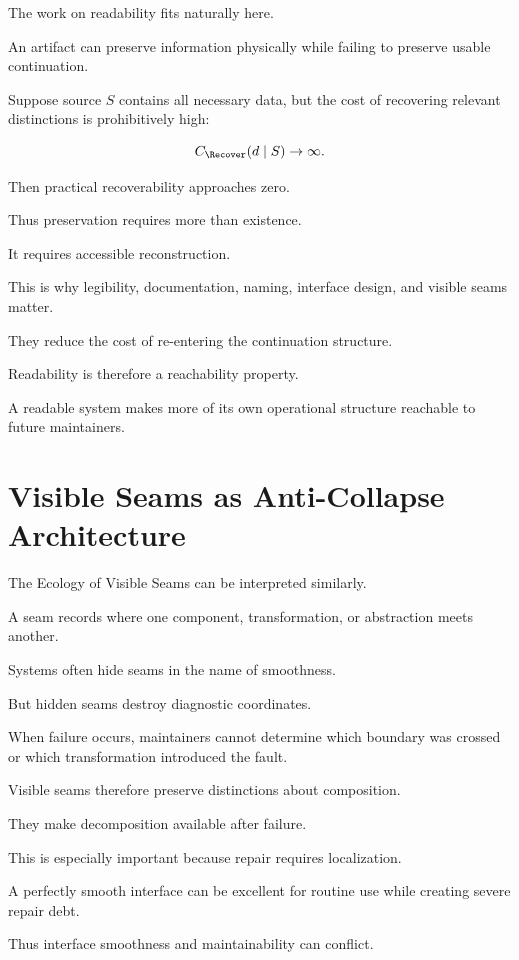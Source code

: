 \documentclass[11pt]{article}
\theoremstyle{remark}
\begin{document}
The work on readability fits naturally here.

An artifact can preserve information physically while failing to preserve usable continuation.

Suppose source $S$ contains all necessary data, but the cost of recovering relevant distinctions is prohibitively high:

\begin{equation}
C_{\Recover}(d\mid S)\rightarrow\infty.
\end{equation}

Then practical recoverability approaches zero.

Thus preservation requires more than existence.

It requires accessible reconstruction.

This is why legibility, documentation, naming, interface design, and visible seams matter.

They reduce the cost of re-entering the continuation structure.

Readability is therefore a reachability property.

A readable system makes more of its own operational structure reachable to future maintainers.

\section{Visible Seams as Anti-Collapse Architecture}

The Ecology of Visible Seams can be interpreted similarly.

A seam records where one component, transformation, or abstraction meets another.

Systems often hide seams in the name of smoothness.

But hidden seams destroy diagnostic coordinates.

When failure occurs, maintainers cannot determine which boundary was crossed or which transformation introduced the fault.

Visible seams therefore preserve distinctions about composition.

They make decomposition available after failure.

This is especially important because repair requires localization.

A perfectly smooth interface can be excellent for routine use while creating severe repair debt.

Thus interface smoothness and maintainability can conflict.
\end{document}
